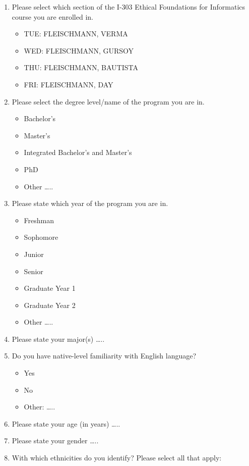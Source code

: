 \documentclass[letterpaper, nobind]{templates/ociamthesis}
\providecommand{\tightlist}{%
  \setlength{\itemsep}{0pt}\setlength{\parskip}{0pt}}
\begin{document}
\begin{enumerate}
\def\labelenumi{\arabic{enumi}.}
\item
  Please select which section of the I-303 Ethical Foundations for Informatics course you are enrolled in.

  \begin{itemize}
  \tightlist
  \item
    TUE: FLEISCHMANN, VERMA
  \item
    WED: FLEISCHMANN, GURSOY
  \item
    THU: FLEISCHMANN, BAUTISTA
  \item
    FRI: FLEISCHMANN, DAY
  \end{itemize}
\item
  Please select the degree level/name of the program you are in.

  \begin{itemize}
  \tightlist
  \item
    Bachelor's
  \item
    Master's
  \item
    Integrated Bachelor's and Master's
  \item
    PhD
  \item
    Other \ldots..
  \end{itemize}
\item
  Please state which year of the program you are in.

  \begin{itemize}
  \tightlist
  \item
    Freshman
  \item
    Sophomore
  \item
    Junior
  \item
    Senior
  \item
    Graduate Year 1
  \item
    Graduate Year 2
  \item
    Other \ldots..
  \end{itemize}
\item
  Please state your major(s) \ldots..
\item
  Do you have native-level familiarity with English language?

  \begin{itemize}
  \tightlist
  \item
    Yes
  \item
    No
  \item
    Other: \ldots..
  \end{itemize}
\item
  Please state your age (in years) \ldots..
\item
  Please state your gender \ldots..
\item
  With which ethnicities do you identify? Please select all that apply:


\end{enumerate}
\end{document}
